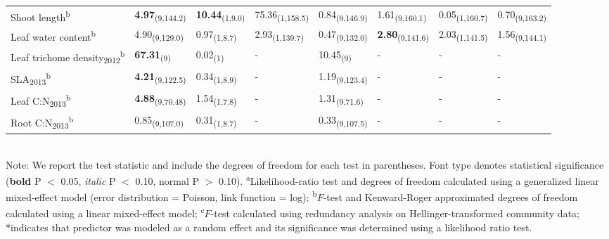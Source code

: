 \documentclass[11pt]{article}
\begin{document}
\begin{table}
\begin{tabular}{llllllll}
Shoot length\textsuperscript{b}              & \textbf{4.97}\textsubscript{(9,144.2)} & \textbf{10.44}\textsubscript{(1,9.0)} & 75.36\textsubscript{(1,158.5)}  & 0.84\textsubscript{(9,146.9)} & 1.61\textsubscript{(9,160.1)} & 0.05\textsubscript{(1,160.7)}  & 0.70\textsubscript{(9,163.2)} \\
Leaf water content\textsuperscript{b}        & 4.90\textsubscript{(9,129.0)} & 0.97\textsubscript{(1,8.7)}  & 2.93\textsubscript{(1,139.7)}   & 0.47\textsubscript{(9,132.0)} & \textbf{2.80}\textsubscript{(9,141.6)} & 2.03\textsubscript{(1,141.5)}  & 1.56\textsubscript{(9,144.1)} \\
Leaf trichome density\textsubscript{2012}\textsuperscript{b} & \textbf{67.31}\textsubscript{(9)}      & 0.02\textsubscript{(1)}      & -               & 10.45\textsubscript{(9)}      & -             & -              & -             \\
SLA\textsubscript{2013}\textsuperscript{b}                   & \textbf{4.21}\textsubscript{(9,122.5)} & 0.34\textsubscript{(1,8.9)}  & -               & 1.19\textsubscript{(9,123.4)} & -             & -              & -             \\
Leaf C:N\textsubscript{2013}\textsuperscript{b}              & \textbf{4.88}\textsubscript{(9,70.48)} & 1.54\textsubscript{(1,7.8)}  & -               & 1.31\textsubscript{(9,71.6)}  & -             & -              & -             \\
Root C:N\textsubscript{2013}\textsuperscript{b}              & 0.85\textsubscript{(9,107.0)} & 0.31\textsubscript{(1,8.7)}  & -               & 0.33\textsubscript{(9,107.5)} & -             & -              & -    \\
\bottomrule
\end{tabular}
\bigskip{}
\\
{\footnotesize Note: We report the test statistic and include the degrees of freedom for each test in parentheses. Font type denotes statistical significance (\textbf{bold} P $<$ 0.05, \textit{italic} P $<$ 0.10, normal P $>$ 0.10). \textsuperscript{a}Likelihood-ratio test and degrees of freedom calculated using a generalized linear mixed-effect model (error distribution = Poisson, link function = log); \textsuperscript{b}$F$-test and Kenward-Roger approximated degrees of freedom calculated using a linear mixed-effect model; \textsuperscript{c}$F$-test calculated using redundancy analysis on Hellinger-transformed community data; *indicates that predictor was modeled as a random effect and its significance was determined using a likelihood ratio test.}
\end{table}
\end{document}
